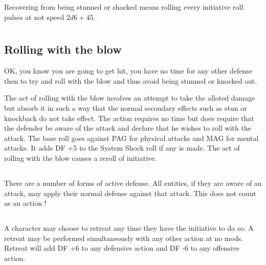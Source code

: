 Recovering from being stunned or shocked means rolling every initiative roll pulses at not speed 
\( 2d6 + 45 \).

\section{}

\subsection{Rolling with the blow}

OK, you know you are going to get hit, you have no time for any other defense then to 
try and roll with the blow and thus avoid being stunned or knocked out.

The act of rolling with the blow involves an attempt to take the
alloted damage but absorb it in such a way that the normal secondary
effects such as stun or knockback do not take effect. The action
requires no time but does require that the defender be aware of the
attack and declare that he wishes to roll with the attack. The base
roll goes against PAG for physical attacks and MAG for mental
attacks. It adds DF +5 to the System Shock roll if any is made.
The act of rolling with the blow causes a reroll of initiative.

\subsection{}

There are a number of forms of active defense. All entities, if they
are aware of an attack, may apply their normal defense against that
attack. This does not count as an action !

\subsection{}

A character may choose to retreat any time they have the initiative to do so.
A retreat may be performed simultaneously with any other action at no mods.
Retreat will add DF +6 to any defensive action and DF -6 to any offensive action.

\subsection{}

